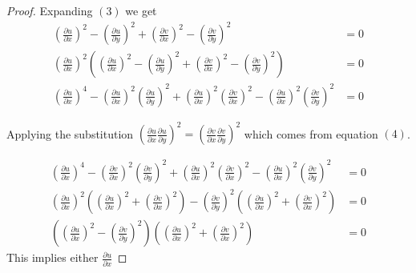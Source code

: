 \documentclass[letter,12pt,reqno]{article}
\begin{document}
\begin{proof}
        Expanding $(3)$ we get 
        \begin{align*}
        (\frac{\partial u}{\partial x})^2- (\frac{\partial u}{\partial y})^2 + (\frac{\partial v}{\partial x})^2-(\frac{\partial v}{\partial y})^2&=0\\
        \left(\frac{\partial u}{\partial x}\right)^2\left(        (\frac{\partial u}{\partial x})^2- (\frac{\partial u}{\partial y})^2 + (\frac{\partial v}{\partial x})^2-(\frac{\partial v}{\partial y})^2\right)&=0            
        \\
        (\frac{\partial u}{\partial x})^4- (\frac{\partial u}{\partial x})^2(\frac{\partial u}{\partial y})^2+(\frac{\partial u}{\partial x})^2(\frac{\partial v}{\partial x})^2-(\frac{\partial u}{\partial x})^2(\frac{\partial v}{\partial y})^2& =0
        \end{align*}

        Applying the substitution $(\frac{\partial u}{\partial x}\frac{\partial u}{\partial y})^2=(\frac{\partial v}{\partial x}\frac{\partial v}{\partial y})^2$ which comes from equation $(4)$.

        \begin{align*}
            (\frac{\partial u}{\partial x})^4- (\frac{\partial v}{\partial x})^2(\frac{\partial v}{\partial y})^2+(\frac{\partial u}{\partial x})^2(\frac{\partial v}{\partial x})^2-(\frac{\partial u}{\partial x})^2(\frac{\partial v}{\partial y})^2& =0\\
            (\frac{\partial u}{\partial x})^2\left((\frac{\partial u}{\partial x})^2 +(\frac{\partial v}{\partial x})^2\right)-(\frac{\partial v}{\partial y})^2\left((\frac{\partial u}{\partial x })^2+ (\frac{\partial v}{\partial x})^2 \right)&=0\\
            \left((\frac{\partial u}{\partial x})^2 -(\frac{\partial v}{\partial y})^2\right)\left((\frac{\partial u}{\partial x})^2 +(\frac{\partial v}{\partial x})^2\right) & = 0
        \end{align*}
        This implies either $\frac{\partial u}{\partial x}$
    

    \end{proof}
\end{document}
